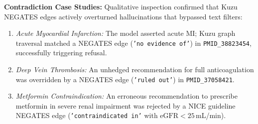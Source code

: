 \documentclass[preprint,12pt,a4paper]{elsarticle}
\begin{document}
\begin{table}[!htbp]
\singlespacing
\centering
\footnotesize
\setlength{\tabcolsep}{4pt}
\caption{Ablation experiments on MedQA-US ($N=50$, seed~42).
         (A) Verification mode comparison varying evidence weight $\beta$.
         (B) Reranker ablation varying relational bonus multiplier $\gamma$.
         Sources: \texttt{step15\_verification\_ablation.json}, \texttt{step15\_rerank\_ablation.json}.}
\label{tab:ablation}
\end{table}

\textbf{Contradiction Case Studies:} Qualitative inspection confirmed that Kuzu
\textsc{NEGATES} edges actively overturned hallucinations that bypassed text filters:
\begin{enumerate}
  \item \emph{Acute Myocardial Infarction:} The model asserted acute MI; Kuzu
        graph traversal matched a \textsc{NEGATES} edge (\texttt{'no evidence of'})
        in \texttt{PMID\-\_38823454}, successfully triggering refusal.
  \item \emph{Deep Vein Thrombosis:} An unhedged recommendation for full
        anticoagulation was overridden by a \textsc{NEGATES} edge (\texttt{'ruled out'})
        in \texttt{PMID\-\_37058421}.
  \item \emph{Metformin Contraindication:} An erroneous recommendation to
        prescribe metformin in severe renal impairment was rejected by a
        NICE guideline \textsc{NEGATES} edge (\texttt{'contraindicated in'}
        with $\text{eGFR} < 25$\,mL/min).
\end{enumerate}
\end{document}
